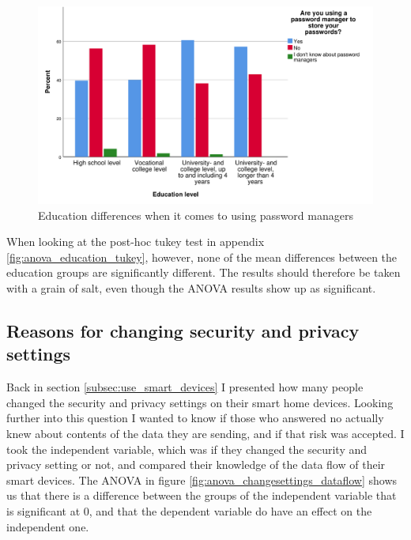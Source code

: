 \begin{figure}[!h]
    \centering
    \includegraphics[scale=0.55]{figures/diagrams/education_password-manager.pdf}
    \caption{Education differences when it comes to using password managers}
    \label{fig:education_password-manager}
\end{figure}

When looking at the post-hoc tukey test in appendix \ref{fig:anova_education_tukey}, however, none of the mean differences between the education groups are significantly different. The results should therefore be taken with a grain of salt, even though the ANOVA results show up as significant. 

\subsection{Reasons for changing security and privacy settings}
Back in section \ref{subsec:use_smart_devices} I presented how many people changed the security and privacy settings on their smart home devices. Looking further into this question I wanted to know if those who answered no actually knew about contents of the data they are sending, and if that risk was accepted. I took the independent variable, which was if they changed the security and privacy setting or not, and compared their knowledge of the data flow of their smart devices. The ANOVA in figure \ref{fig:anova_changesettings_dataflow} shows us that there is a difference between the groups of the independent variable that is significant at 0, and that the dependent variable do have an effect on the independent one. 

